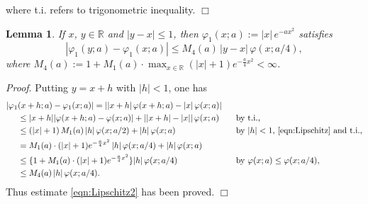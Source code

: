 \documentclass[a4paper,12pt]{article}
\theoremstyle{plain}
\newtheorem{lemma}[theorem]{Lemma}
\def\R{\mathbb{R}}
\def\ds{\displaystyle}
\begin{document}
where t.i. refers to trigonometric inequality. \hfill $\Box$ 
\begin{lemma} \label{lem:Lipschitz2} 
If $x$, $y \in \R$ and $| y-x | \le 1$, then 
$\varphi_1(x; a) := |x| \, e^{-a x^2}$ satisfies    
\begin{equation} \label{eqn:Lipschitz2}
| \varphi_1( y; a) - \varphi_1( x; a ) | \le M_4( a ) \, 
|y-x| \, \varphi( x; a/4 ),     
\end{equation}
where $M_4(a) := 1+ M_1(a) \cdot \ds \max_{x \in \R} (|x| +1) 
e^{-\frac{a}{4} x^2} < \infty$. 
\end{lemma}
{\it Proof}. Putting $y = x + h$ with $|h| < 1$, one has  
\begin{alignat*}{2}
| \varphi_1 
& ( x+h; a ) - \varphi_1( x; a ) | = ||x+h| \, \varphi(x+h; a) - |x| \, \varphi(x; a)| &  &  \\
& \le |x+h| |\varphi(x+h; a) - \varphi(x; a) | + ||x+h|-|x|| \, \varphi(x; a) \quad & & \mbox{by t.i.},  \\
& \le (|x| + 1) \, M_1(a) \, |h| \, \varphi(x; a/2) + |h| \, \varphi(x; a)  \quad & & \mbox{by $|h| < 1$, 
\eqref{eqn:Lipschitz} and t.i.}, \\
& = M_1(a) \cdot (|x|+1) e^{-\frac{a}{4} x^2} \, |h| \, \varphi(x; a/4) + |h| \, \varphi(x; a) & & \\
& \le \{ 1 + M_1(a) \cdot (|x|+1) e^{-\frac{a}{4} x^2} \} |h| \, \varphi(x; a/4) & & 
\mbox{by $\varphi(x; a) \le \varphi(x; a/4)$}, \\
& \le M_4(a) \, |h| \, \varphi(x; a/4).  & & 
\end{alignat*} 
Thus estimate \eqref{eqn:Lipschitz2} has been proved. \hfill $\Box$
\end{document}
